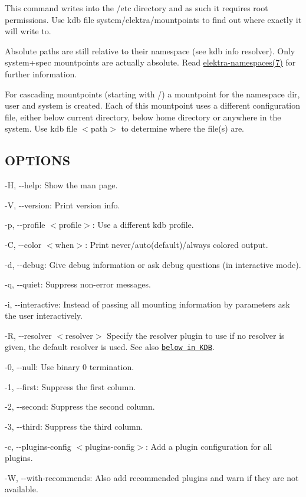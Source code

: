 This command writes into the {\ttfamily /etc} directory and as such it requires root permissions. Use {\ttfamily kdb file system/elektra/mountpoints} to find out where exactly it will write to.

Absolute paths are still relative to their namespace (see {\ttfamily kdb info resolver}). Only system+spec mountpoints are actually absolute. Read \hyperlink{md_doc_help_elektra-namespaces_doc_help_elektra-namespaces_md}{elektra-\/namespaces(7)} for further information.

For cascading mountpoints (starting with {\ttfamily /}) a mountpoint for the namespace {\ttfamily dir}, {\ttfamily user} and {\ttfamily system} is created. Each of this mountpoint uses a different configuration file, either below current directory, below home directory or anywhere in the system. Use {\ttfamily kdb file $<$path$>$} to determine where the file(s) are.

\subsection*{O\+P\+T\+I\+O\+NS}


\begin{DoxyItemize}
\item {\ttfamily -\/H}, {\ttfamily -\/-\/help}\+: Show the man page.
\item {\ttfamily -\/V}, {\ttfamily -\/-\/version}\+: Print version info.
\item {\ttfamily -\/p}, {\ttfamily -\/-\/profile $<$profile$>$}\+: Use a different kdb profile.
\item {\ttfamily -\/C}, {\ttfamily -\/-\/color $<$when$>$}\+: Print never/auto(default)/always colored output.
\item {\ttfamily -\/d}, {\ttfamily -\/-\/debug}\+: Give debug information or ask debug questions (in interactive mode).
\item {\ttfamily -\/q}, {\ttfamily -\/-\/quiet}\+: Suppress non-\/error messages.
\item {\ttfamily -\/i}, {\ttfamily -\/-\/interactive}\+: Instead of passing all mounting information by parameters ask the user interactively.
\item {\ttfamily -\/R}, {\ttfamily -\/-\/resolver $<$resolver$>$} Specify the resolver plugin to use if no resolver is given, the default resolver is used. See also \href{#KDB}{\tt below in K\+DB}.
\item {\ttfamily -\/0}, {\ttfamily -\/-\/null}\+: Use binary 0 termination.
\item {\ttfamily -\/1}, {\ttfamily -\/-\/first}\+: Suppress the first column.
\item {\ttfamily -\/2}, {\ttfamily -\/-\/second}\+: Suppress the second column.
\item {\ttfamily -\/3}, {\ttfamily -\/-\/third}\+: Suppress the third column.
\item {\ttfamily -\/c}, {\ttfamily -\/-\/plugins-\/config $<$plugins-\/config$>$}\+: Add a plugin configuration for all plugins.
\item {\ttfamily -\/W}, {\ttfamily -\/-\/with-\/recommends}\+: Also add recommended plugins and warn if they are not available.
\end{DoxyItemize}

